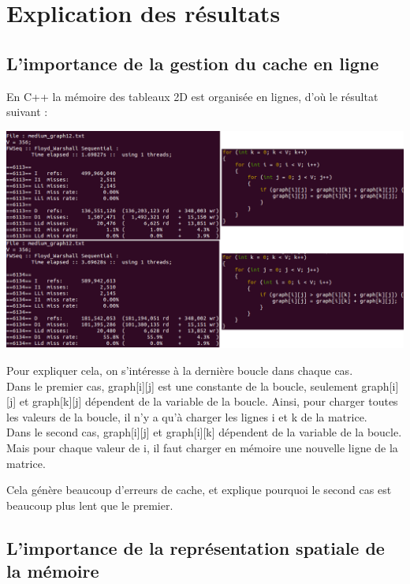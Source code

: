 \documentclass[a4paper,11pt]{article}
\begin{document}
\section{Explication des résultats}
\subsection{L'importance de la gestion du cache en ligne}

En C++ la mémoire des tableaux 2D est organisée en lignes, d'où le résultat suivant :

\begin{center}
  \includegraphics[scale=0.6]{Cache_Importance.png}
\end{center}

Pour expliquer cela, on s'intéresse à la dernière boucle dans chaque cas.\\

Dans le premier cas, graph[i][j] est une constante de la boucle, seulement graph[i][j] et graph[k][j] dépendent de la variable de la boucle. Ainsi, pour charger toutes les valeurs de la boucle, il n'y a qu'à charger les lignes i et k de la matrice.\\

Dans le second cas, graph[i][j] et graph[i][k] dépendent de la variable de la boucle. Mais pour chaque valeur de i, il faut charger en mémoire une nouvelle ligne de la matrice.

\noindent Cela génère beaucoup d'erreurs de cache, et explique pourquoi le second cas est beaucoup plus lent que le premier.

\subsection{L'importance de la représentation spatiale de la mémoire}
\end{document}
